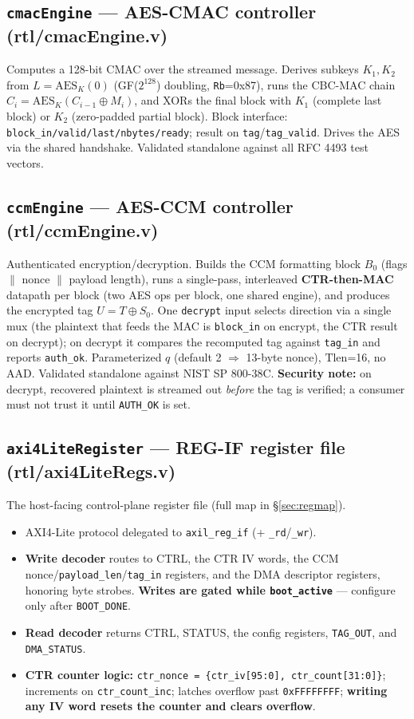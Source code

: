\documentclass[11pt,a4paper]{article}
\newcommand{\reg}[1]{\texttt{#1}}
\newcommand{\bit}[1]{\texttt{#1}}
\begin{document}
\subsection{\texttt{cmacEngine} --- AES-CMAC controller (rtl/cmacEngine.v)}
Computes a 128-bit CMAC over the streamed message. Derives subkeys \(K_1,K_2\) from
\(L=\mathrm{AES}_K(0)\) (GF(\(2^{128}\)) doubling, \texttt{Rb}=0x87), runs the CBC-MAC chain
\(C_i=\mathrm{AES}_K(C_{i-1}\oplus M_i)\), and XORs the final block with \(K_1\) (complete last
block) or \(K_2\) (zero-padded partial block). Block interface:
\texttt{block\_in/valid/last/nbytes/ready}; result on \texttt{tag}/\texttt{tag\_valid}. Drives
the AES via the shared handshake. Validated standalone against all RFC 4493 test vectors.

\subsection{\texttt{ccmEngine} --- AES-CCM controller (rtl/ccmEngine.v)}
Authenticated encryption/decryption. Builds the CCM formatting block \(B_0\) (flags $\|$ nonce
$\|$ payload length), runs a single-pass, interleaved \textbf{CTR-then-MAC} datapath per block
(two AES ops per block, one shared engine), and produces the encrypted tag
\(U=T\oplus S_0\). One \texttt{decrypt} input selects direction via a single mux (the plaintext
that feeds the MAC is \texttt{block\_in} on encrypt, the CTR result on decrypt); on decrypt it
compares the recomputed tag against \texttt{tag\_in} and reports \texttt{auth\_ok}.
Parameterized \(q\) (default 2 $\Rightarrow$ 13-byte nonce), \(\text{Tlen}\)=16, no AAD.
Validated standalone against NIST SP 800-38C. \textbf{Security note:} on decrypt, recovered
plaintext is streamed out \emph{before} the tag is verified; a consumer must not trust it
until \bit{AUTH\_OK} is set.

\subsection{\texttt{axi4LiteRegister} --- REG-IF register file (rtl/axi4LiteRegs.v)}
The host-facing control-plane register file (full map in \S\ref{sec:regmap}).
\begin{itemize}[nosep]
  \item AXI4-Lite protocol delegated to \texttt{axil\_reg\_if} (+ \texttt{\_rd}/\texttt{\_wr}).
  \item \textbf{Write decoder} routes to CTRL, the CTR IV words, the CCM nonce/\texttt{payload\_len}/\texttt{tag\_in}
        registers, and the DMA descriptor registers, honoring byte strobes. \textbf{Writes are
        gated while \texttt{boot\_active}} --- configure only after \bit{BOOT\_DONE}.
  \item \textbf{Read decoder} returns CTRL, STATUS, the config registers, \reg{TAG\_OUT}, and
        \reg{DMA\_STATUS}.
  \item \textbf{CTR counter logic:} \texttt{ctr\_nonce = \{ctr\_iv[95:0], ctr\_count[31:0]\}};
        increments on \texttt{ctr\_count\_inc}; latches overflow past \texttt{0xFFFFFFFF};
        \textbf{writing any IV word resets the counter and clears overflow}.
\end{itemize}
\end{document}
